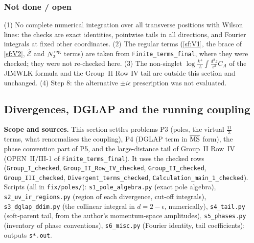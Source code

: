 \documentclass[10pt]{article}
\begin{document}
\subsubsection{Not done / open}
\noindent (1) No complete numerical integration over all transverse positions with Wilson lines: the checks are exact identities, pointwise tails in all directions, and Fourier integrals at fixed other coordinates. (2) The regular terms (\eqref{sf:V1}, the brace of \eqref{sf:V2}, $\widehat{\mathcal{E}}$ and $N_{2}^{\rm reg}$ terms) are taken from \texttt{Finite\_terms\_final}, where they were checked; they were not re-checked here. (3) The non-singlet $\log\frac{k^{+}}{\Lambda}\int\frac{d^{2}z}{z^{2}}C_{A}$ of the JIMWLK formula and the Group~II Row IV tail are outside this section and unchanged. (4) Step 8: the alternative $\pm i\epsilon$ prescription was not evaluated.


\subsection{Divergences, DGLAP and the running coupling}
\label{sec:poles-dglap}

\noindent\textbf{Scope and sources.} This section settles problems P3 (poles, the virtual $\frac{11}{3}$ terms, what renormalises the coupling), P4 (DGLAP term in $\overline{\rm MS}$ form), the phase convention part of P5, and the large-distance tail of Group~II Row~IV (OPEN~II/III-1 of \texttt{Finite\_terms\_final}). It uses the checked rows (\texttt{Group\_I\_checked}, \texttt{Group\_II\_Row\_IV\_checked}, \texttt{Group\_II\_checked}, \texttt{Group\_III\_checked}, \texttt{Divergent\_terms\_checked}, \texttt{Calculation\_main\_1\_checked}). Scripts (all in \texttt{fix/poles/}): \texttt{s1\_pole\_algebra.py} (exact pole algebra), \texttt{s2\_uv\_ir\_regions.py} (region of each divergence, cut-off integrals), \texttt{s3\_dglap\_ddim.py} (the collinear integral in $d=2-\epsilon$, numerically), \texttt{s4\_tail.py} (soft-parent tail, from the author's momentum-space amplitudes), \texttt{s5\_phases.py} (inventory of phase conventions), \texttt{s6\_misc.py} (Fourier identity, tail coefficients); outputs \texttt{s*.out}.
\end{document}

